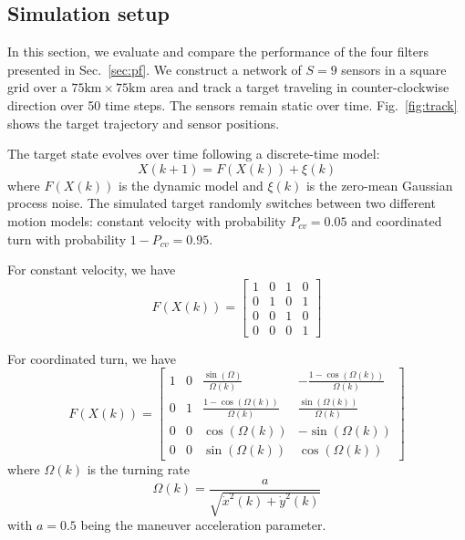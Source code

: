 \documentclass[10pt,letterpaper,final]{article}
\begin{document}
\subsection{Simulation setup}
In this section, we evaluate and compare the performance of the four filters presented in Sec.~\ref{sec:pf}. We construct a network of $S=9$ sensors in a square grid over a $75\text{km} \times 75\text{km}$ area and track a target traveling in counter-clockwise direction over 50 time steps. The sensors remain static over time. Fig.~\ref{fig:track} shows the target trajectory and sensor positions. 

The target state evolves over time following a discrete-time model:
\begin{equation}
X(k+1) = F(X(k))+\xi(k)
\end{equation}
where $F(X(k))$ is the dynamic model and $\xi(k)$ is the zero-mean Gaussian process noise. The simulated target randomly switches between two different motion models: constant velocity with probability $P_{cv} = 0.05$ and coordinated turn with probability $1-P_{cv}=0.95$. 

For constant velocity, we have
\begin{equation}
F(X(k)) = 
\left[
\begin{array}{cccc}
1 & 0 & 1 & 0 \\
0 & 1 & 0 & 1 \\
0 & 0 & 1 & 0 \\
0 & 0 & 0 & 1
\end{array}
\right]
\end{equation}

For coordinated turn, we have 
\begin{equation}
F(X(k)) = 
\left[
\begin{array}{cccc}
1 & 0 & \frac{\sin(\Omega)}{\Omega (k)} & -\frac{1-\cos(\Omega (k))}{\Omega (k)} \\
0 & 1 & \frac{1-\cos(\Omega (k))}{\Omega (k)} & \frac{\sin(\Omega (k))}{\Omega (k)} \\
0 & 0 & \cos(\Omega (k)) & -\sin(\Omega (k)) \\
0 & 0 & \sin(\Omega (k)) & \cos(\Omega (k)) 
\end{array}
\right]
\end{equation}
where $\Omega (k)$ is the turning rate
\begin{equation}
\Omega (k) = \frac{a}{\sqrt{\dot{x}^2(k)+\dot{y}^2(k)}}
\end{equation}
with $a=0.5$ being the maneuver acceleration parameter. 
\end{document}
